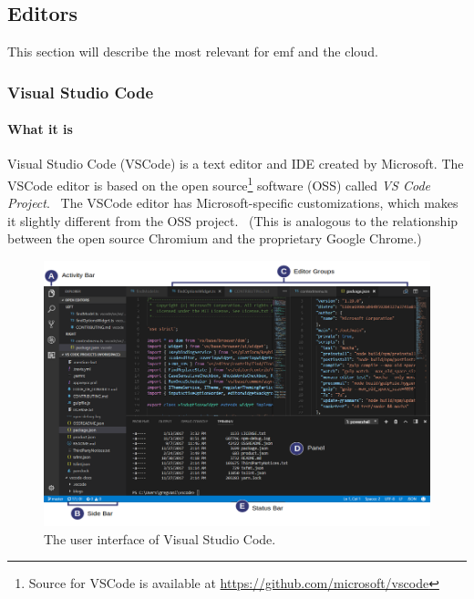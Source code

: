 \subsection{Editors}\label{sec:editors}

This section will describe the most relevant  for \acrlong{emf} and the \gls{cloud}.

\subsubsection{Visual Studio Code}\label{sec:vscode}

\paragraph*{What it is}
Visual Studio Code (\gls{VSCode}) is a text editor and \acrfull{IDE} created by
Microsoft. The VSCode editor is based on the \gls{open source}\footnote{Source for VSCode is available at \href{https://github.com/microsoft/vscode}{https://github.com/microsoft/vscode}} software (OSS) called \emph{VS Code Project}.~\cite{helmingEclipseTheiaIDE2019} 
The VSCode editor has Microsoft-specific customizations, which makes it slightly different from the OSS project.~\cite{microsoftMicrosoftVscode2020} (This is analogous to the relationship between the \gls{open source} Chromium and the proprietary Google Chrome.)

\begin{figure}[htbp]  %
  \centering
  \includegraphics[width=\textwidth]{figures/vscode-ui}
  \caption[Visual Studio Code User Interface]{The user interface of Visual Studio Code.\cite{microsoftVisualStudioCode2020}}\label{fig:vscode-ui}
\end{figure}

